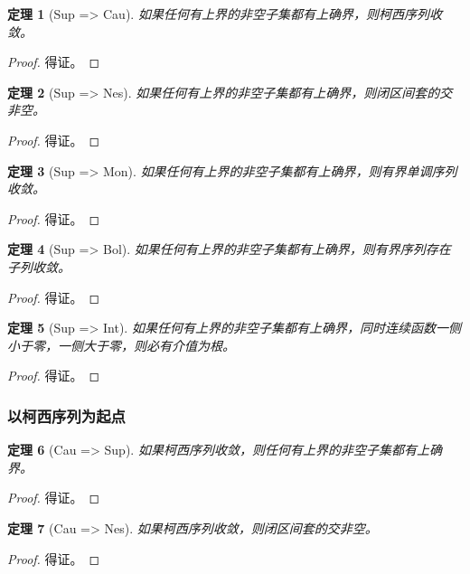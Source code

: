 \documentclass[a4paper,12pt]{article}
\newtheorem{theorem}{定理}
\begin{document}
\begin{theorem}[Sup => Cau]
  如果任何有上界的非空子集都有上确界，则柯西序列收敛。
\end{theorem}
\begin{proof}
    得证。
\end{proof}

\begin{theorem}[Sup => Nes]
  如果任何有上界的非空子集都有上确界，则闭区间套的交非空。
\end{theorem}
\begin{proof}
    得证。
\end{proof}

\begin{theorem}[Sup => Mon]
  如果任何有上界的非空子集都有上确界，则有界单调序列收敛。
\end{theorem}
\begin{proof}
    得证。
\end{proof}

\begin{theorem}[Sup => Bol]
  如果任何有上界的非空子集都有上确界，则有界序列存在子列收敛。
\end{theorem}
\begin{proof}
    得证。
\end{proof}

\begin{theorem}[Sup => Int]
  如果任何有上界的非空子集都有上确界，同时连续函数一侧小于零，一侧大于零，则必有介值为根。
\end{theorem}
\begin{proof}
    得证。
\end{proof}

\subsubsection{以柯西序列为起点}

\begin{theorem}[Cau => Sup]
  如果柯西序列收敛，则任何有上界的非空子集都有上确界。
\end{theorem}
\begin{proof}
    得证。
\end{proof}

\begin{theorem}[Cau => Nes]
  如果柯西序列收敛，则闭区间套的交非空。
\end{theorem}
\begin{proof}
    得证。
\end{proof}
\end{document}
